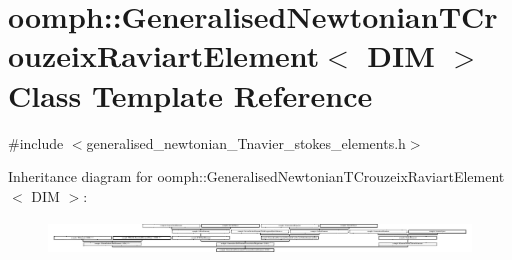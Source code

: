 \hypertarget{classoomph_1_1GeneralisedNewtonianTCrouzeixRaviartElement}{}\section{oomph\+:\+:Generalised\+Newtonian\+T\+Crouzeix\+Raviart\+Element$<$ D\+IM $>$ Class Template Reference}
\label{classoomph_1_1GeneralisedNewtonianTCrouzeixRaviartElement}


{\ttfamily \#include $<$generalised\+\_\+newtonian\+\_\+\+Tnavier\+\_\+stokes\+\_\+elements.\+h$>$}

Inheritance diagram for oomph\+:\+:Generalised\+Newtonian\+T\+Crouzeix\+Raviart\+Element$<$ D\+IM $>$\+:\begin{figure}[H]
\begin{center}
\leavevmode
\includegraphics[height=0.943396cm]{classoomph_1_1GeneralisedNewtonianTCrouzeixRaviartElement}
\end{center}
\end{figure}
